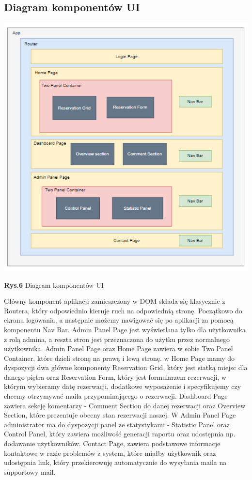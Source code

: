 \documentclass{article}
\begin{document}
\subsection{Diagram komponentów UI}
\hspace*{-0.5cm}\includegraphics[scale=0.8]{components_diagram}
\begin{center}\textbf{Rys.6} Diagram komponentów UI \end{center}
Główny komponent aplikacji zamieszczony w DOM składa się klasycznie z Routera, który odpowiednio kieruje ruch na odpowiednią stronę. Początkowo do ekranu logowania, a następnie możemy nawigować się po aplikacji za pomocą komponentu Nav Bar. Admin Panel Page jest wyświetlana tylko dla użytkownika z rolą admina, a reszta stron jest przeznaczona do użytku przez normalnego użytkownika. Admin Panel Page oraz Home Page zawiera w sobie Two Panel Container, które dzieli stronę na prawą i lewą stronę. w Home Page mamy do dyspozycji dwa główne komponenty Reservation Grid, który jest siatką miejsc dla danego piętra oraz Reservation Form, który jest formularzem rezerwacji, w którym wybieramy datę rezerwacji, dodatkowe wyposażenie i specyfikujemy czy chcemy otrzymywać maila przypominającego o rezerwacji. Dashboard Page zawiera sekcję komentarzy - Comment Section do danej rezerwacji oraz Overview Section, które prezentuje obecny stan rezerwacji naszej. W Admin Panel Page administrator ma do dyspozycji panel ze statystykami - Statistic Panel oraz Control Panel, który zawiera możliwość generacji raportu oraz udostępnia np. dodawanie użytkowników. Contact Page, zawiera podstawowe informacje kontaktowe w razie problemów z system, które miałby użytkownik oraz udostępnia link, który przekierowuję automatycznie do wysyłania maila na supportowy mail.
\end{document}
